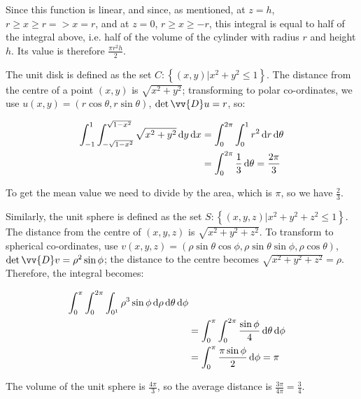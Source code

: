 Since this function is linear, and since, as mentioned, at $z = h$, $r \geq x \geq r => x = r$, and at $z = 0$, $r \geq x \geq -r$, this integral is equal to half of the integral above, i.e. half of the volume of the cylinder with radius $r$ and height $h$. Its value is therefore $\frac{\pi r^2h}{2}$.


The unit disk is defined as the set $C: \left\{(x, y) | x^2 + y^2 \leq 1\right\}$. The distance from the centre of a point $(x, y)$ is $\sqrt{x^2 + y^2}$; transforming to polar co-ordinates, we use $u(x, y) = (r\cos\theta, r\sin\theta)$, $\detm \vv{D}u = r$, so:

\begin{align*}
  \int_{-1}^1 \int_{-\sqrt{1 - x^2}}^{\sqrt{1 - x^2}} \sqrt{x^2 + y^2} \mathop{}\!\mathrm{d} y \mathop{}\!\mathrm{d} x &= \int_0^{2\pi} \int_0^1 r^2 \mathop{}\!\mathrm{d} r \mathop{}\!\mathrm{d} \theta \\
  &= \int_0^{2\pi} \frac{1}{3} \mathop{}\!\mathrm{d} \theta = \frac{2\pi}{3}
\end{align*}

To get the mean value we need to divide by the area, which is $\pi$, so we have $\frac{2}{3}$.

Similarly, the unit sphere is defined as the set $S: \left\{(x, y, z) | x^2 + y^2 + z^2 \leq 1\right\}$. The distance from the centre of $(x, y, z)$ is $\sqrt{x^2 + y^2 + z^2}$. To transform to spherical co-ordinates, use $v(x, y, z) = (\rho \sin\theta \cos\phi, \rho \sin\theta \sin\phi, \rho \cos\theta)$, $\detm \vv{D}v = \rho^2 \sin\phi$; the distance to the centre becomes $\sqrt{x^2 + y^2 + z^2} = \rho$. Therefore, the integral becomes:

\begin{align*}
  \int_0^{\pi} \int_0^{2\pi} \int_{0^1} \rho^3 \sin\phi \mathop{}\!\mathrm{d} \rho \mathop{}\!\mathrm{d} \theta \mathop{}\!\mathrm{d} \phi \\
  &= \int_0^{\pi} \int_0^{2\pi} \frac{\sin\phi}{4} \mathop{}\!\mathrm{d} \theta \mathop{}\!\mathrm{d} \phi \\
  &= \int_0^{\pi} \frac{\pi \sin\phi}{2} \mathop{}\!\mathrm{d} \phi = \pi
\end{align*}

The volume of the unit sphere is $\frac{4\pi}{3}$, so the average distance is $\frac{3\pi}{4\pi} = \frac{3}{4}$.


